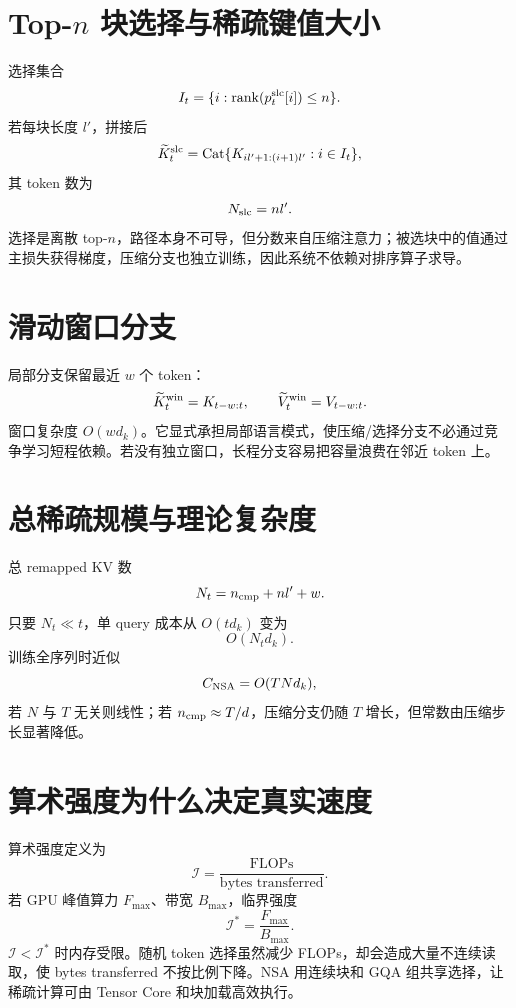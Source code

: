 \documentclass[UTF8,12pt,a4paper,fontset=none]{ctexart}
\numberwithin{equation}{section}
\begin{document}
\section{Top-$n$ 块选择与稀疏键值大小}
选择集合
\begin{equation}
 I_t=\{i:\operatorname{rank}(p_t^{\rm slc}[i])\le n\}.
\end{equation}
若每块长度 $l'$，拼接后
\begin{equation}
 \widetilde K_t^{\rm slc}
 =\operatorname{Cat}\{K_{il'+1:(i+1)l'}:i\in I_t\},
\end{equation}
其 token 数为
\begin{equation}
 N_{\rm slc}=nl'.
\end{equation}
选择是离散 top-$n$，路径本身不可导，但分数来自压缩注意力；被选块中的值通过主损失获得梯度，压缩分支也独立训练，因此系统不依赖对排序算子求导。

\section{滑动窗口分支}
局部分支保留最近 $w$ 个 token：
\begin{equation}
 \widetilde K_t^{\rm win}=K_{t-w:t},\qquad
 \widetilde V_t^{\rm win}=V_{t-w:t}.
\end{equation}
窗口复杂度 $O(wd_k)$。它显式承担局部语言模式，使压缩/选择分支不必通过竞争学习短程依赖。若没有独立窗口，长程分支容易把容量浪费在邻近 token 上。

\section{总稀疏规模与理论复杂度}
总 remapped KV 数
\begin{equation}
 N_t=n_{\rm cmp}+nl'+w.
\end{equation}
只要 $N_t\ll t$，单 query 成本从 $O(td_k)$ 变为
\begin{equation}
 O(N_td_k).
\end{equation}
训练全序列时近似
\begin{equation}
 C_{\rm NSA}=O(TN d_k),
\end{equation}
若 $N$ 与 $T$ 无关则线性；若 $n_{\rm cmp}\approx T/d$，压缩分支仍随 $T$ 增长，但常数由压缩步长显著降低。

\section{算术强度为什么决定真实速度}
算术强度定义为
\begin{equation}
 \mathcal I=\frac{\text{FLOPs}}{\text{bytes transferred}}.
\end{equation}
若 GPU 峰值算力 $F_{\max}$、带宽 $B_{\max}$，临界强度
\begin{equation}
 \mathcal I^*=\frac{F_{\max}}{B_{\max}}.
\end{equation}
$\mathcal I<\mathcal I^*$ 时内存受限。随机 token 选择虽然减少 FLOPs，却会造成大量不连续读取，使 bytes transferred 不按比例下降。NSA 用连续块和 GQA 组共享选择，让稀疏计算可由 Tensor Core 和块加载高效执行。
\end{document}
